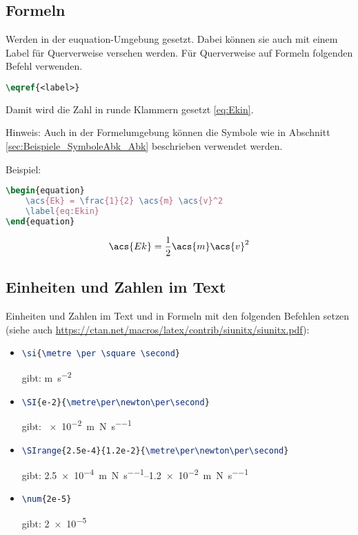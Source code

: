 \subsection{Formeln}
\label{sec:Beispiele_Formeln}
%
Werden in der euquation-Umgebung gesetzt.
Dabei können sie auch mit einem Label für Querverweise versehen werden.
Für Querverweise auf Formeln folgenden Befehl verwenden.
\begin{lstlisting}[language=tex]
\eqref{<label>}
\end{lstlisting}
%
Damit wird die Zahl in runde Klammern gesetzt \eqref{eq:Ekin}.
\par
Hinweis: Auch in der Formelumgebung können die Symbole wie in Abschnitt \ref{sec:Beispiele_SymboleAbk_Abk} beschrieben verwendet werden.
\par
Beispiel:
%
\begin{lstlisting}[language=tex]
\begin{equation}
    \acs{Ek} = \frac{1}{2} \acs{m} \acs{v}^2
    \label{eq:Ekin}
\end{equation}
\end{lstlisting}
%
\begin{equation}
    \acs{Ek} = \frac{1}{2} \acs{m} \acs{v}^2
    \label{eq:Ekin}
\end{equation}
%
%
%
\subsection{Einheiten und Zahlen im Text}
\label{sec:Beispiele_EinheitenZahlen}
%
Einheiten und Zahlen im Text und in Formeln mit den folgenden Befehlen setzen
(siehe auch \url{https://ctan.net/macros/latex/contrib/siunitx/siunitx.pdf}):
%
\begin{itemize}
    \item 
\begin{lstlisting}[language=tex]
\si{\metre \per \square \second}
\end{lstlisting}
gibt: \si{\metre \per \square \second}\\
%
    \item 
\begin{lstlisting}[language=tex]
\SI{e-2}{\metre\per\newton\per\second}
\end{lstlisting}
gibt: \SI{e-2}{\metre\per\newton\per\second}\\
%
    \item 
\begin{lstlisting}[language=tex]
\SIrange{2.5e-4}{1.2e-2}{\metre\per\newton\per\second}
\end{lstlisting}
gibt: \SIrange{2.5e-4}{1.2e-2}{\metre\per\newton\per\second}\\
%
    \item 
\begin{lstlisting}[language=tex]
\num{2e-5}
\end{lstlisting}
gibt: \num{2e-5}
\end{itemize}
%
%
%
%
